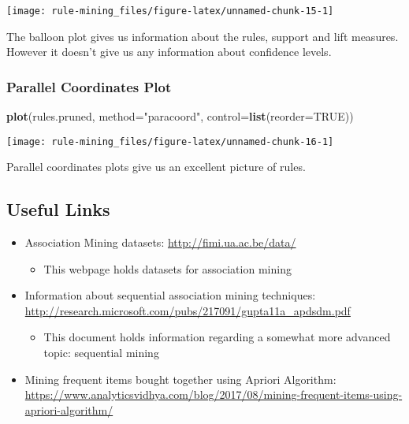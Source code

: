 \documentclass[]{article}
\newenvironment{Shaded}{\begin{snugshade}}{\end{snugshade}}
\newcommand{\DataTypeTok}[1]{\textcolor[rgb]{0.13,0.29,0.53}{#1}}
\newcommand{\KeywordTok}[1]{\textcolor[rgb]{0.13,0.29,0.53}{\textbf{#1}}}
\newcommand{\NormalTok}[1]{#1}
\newcommand{\OtherTok}[1]{\textcolor[rgb]{0.56,0.35,0.01}{#1}}
\newcommand{\StringTok}[1]{\textcolor[rgb]{0.31,0.60,0.02}{#1}}
\providecommand{\tightlist}{%
  \setlength{\itemsep}{0pt}\setlength{\parskip}{0pt}}
\begin{document}
\begin{center}\texttt{[image: rule-mining\_files/figure-latex/unnamed-chunk-15-1]} \end{center}

The balloon plot gives us information about the rules, support and lift
measures. However it doesn't give us any information about confidence
levels.

\hypertarget{parallel-coordinates-plot}{%
\subsubsection{Parallel Coordinates
Plot}\label{parallel-coordinates-plot}}

\begin{Shaded}
\begin{Highlighting}[]
\KeywordTok{plot}\NormalTok{(rules.pruned, }\DataTypeTok{method=}\StringTok{"paracoord"}\NormalTok{, }\DataTypeTok{control=}\KeywordTok{list}\NormalTok{(}\DataTypeTok{reorder=}\OtherTok{TRUE}\NormalTok{))}
\end{Highlighting}
\end{Shaded}

\begin{center}\texttt{[image: rule-mining\_files/figure-latex/unnamed-chunk-16-1]} \end{center}

Parallel coordinates plots give us an excellent picture of rules.

\hypertarget{useful-links}{%
\subsection{Useful Links}\label{useful-links}}

\begin{itemize}
\tightlist
\item
  Association Mining datasets: \url{http://fimi.ua.ac.be/data/}

  \begin{itemize}
  \tightlist
  \item
    This webpage holds datasets for association mining
  \end{itemize}
\item
  Information about sequential association mining techniques:
  \url{http://research.microsoft.com/pubs/217091/gupta11a_apdsdm.pdf}

  \begin{itemize}
  \tightlist
  \item
    This document holds information regarding a somewhat more advanced
    topic: sequential mining
  \end{itemize}
\item
  Mining frequent items bought together using Apriori Algorithm:
  \url{https://www.analyticsvidhya.com/blog/2017/08/mining-frequent-items-using-apriori-algorithm/}
\end{itemize}
\end{document}
